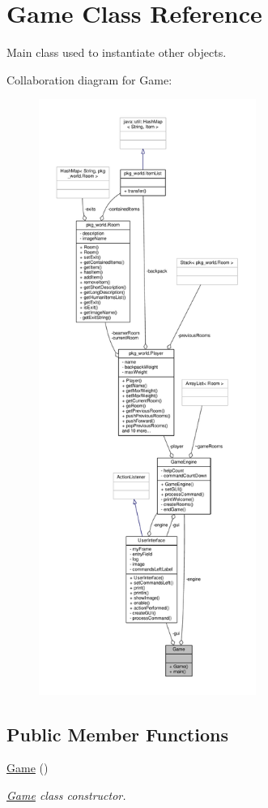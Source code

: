 \hypertarget{classGame}{\section{Game Class Reference}
\label{classGame}
}


Main class used to instantiate other objects.  




Collaboration diagram for Game\-:\nopagebreak
\begin{figure}[H]
\begin{center}
\leavevmode
\includegraphics[height=550pt]{classGame__coll__graph}
\end{center}
\end{figure}
\subsection*{Public Member Functions}
\begin{DoxyCompactItemize}
\item 
\hyperlink{classGame_a2e034e53e9c032964ecd2a831b29a616}{Game} ()
\begin{DoxyCompactList}\small\item\em \hyperlink{classGame}{Game} class constructor. \end{DoxyCompactList}\end{DoxyCompactItemize}
